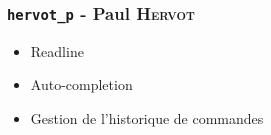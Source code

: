 \subsubsection{\texttt{hervot\_p} - Paul \textsc{Hervot}}

\begin{itemize}
    \item Readline
    \item Auto-completion
    \item Gestion de l'historique de commandes
\end{itemize}
